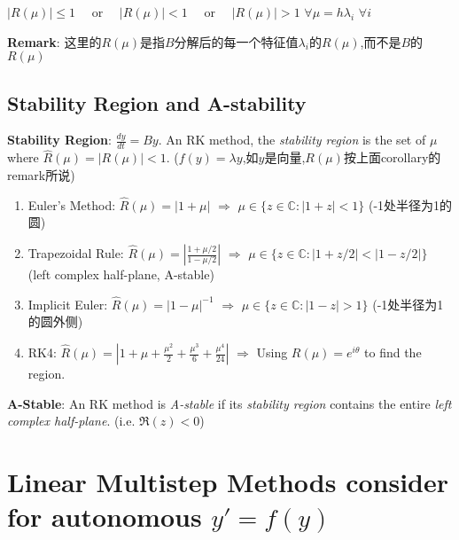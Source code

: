 \documentclass[9pt]{article}
\begin{document}
\quad $|R(\mu)|\leq1$ \ \ or \ \ $|R(\mu)|<1$ \ \ or \ \ $|R(\mu)|>1$ \quad $\forall \mu=h\lambda_i$ $\forall i$ 

\quad \textbf{Remark}: 这里的$R(\mu)$是指$B$分解后的每一个特征值$\lambda_i$的$R(\mu)$,而不是$B$的$R(\mu)$


\subsection{Stability Region and A-stability} %

\textbf{Stability Region}: {\small $\frac{dy}{dt}=By$. An RK method, the \textit{stability region} is the set of $\mu$ where $\widehat{R}(\mu)=|R(\mu)|<1$.} {\tiny ($f(y)=\lambda y$,如$y$是向量,$R(\mu)$按上面corollary的remark所说)} 

\begin{enumerate}[itemsep=-2pt, topsep=-2pt]
    \item Euler's Method: $\widehat{R}(\mu)=|1+\mu|$ \quad $\Rightarrow$ \quad $\mu\in\{z\in\mathbb{C}:|1+z|<1\}$ {\scriptsize (-1处半径为1的圆)}
    \item Trapezoidal Rule: $\widehat{R}(\mu)=\left|\frac{1+\mu/2}{1-\mu/2}\right|$ \quad $\Rightarrow$ \quad $\mu\in\{z\in\mathbb{C}:|1+z/2|<|1-z/2|\}$ {\scriptsize (left complex half-plane, A-stable)}
    \item Implicit Euler: $\widehat{R}(\mu)=|1-\mu|^{-1}$ \quad $\Rightarrow$ \quad $\mu\in\{z\in\mathbb{C}:|1-z|>1\}$ {\scriptsize (-1处半径为1的圆外侧)}
    \item RK4: $\widehat{R}(\mu)=\left|1+\mu+\frac{\mu^2}{2}+\frac{\mu^3}{6}+\frac{\mu^4}{24}\right|$ \quad $\Rightarrow$ \quad Using $R(\mu)=e^{i\theta}$ to find the region.
\end{enumerate}

\textbf{A-Stable}: An RK method is \textit{A-stable} if its \textit{stability region} contains the entire \textit{left complex half-plane}. {\scriptsize (i.e. $\Re(z)<0$)}


\section{Linear Multistep Methods {\scriptsize consider for autonomous $y'=f(y)$}} %

\vspace{-6pt}
\vspace{-6pt}
\end{document}
